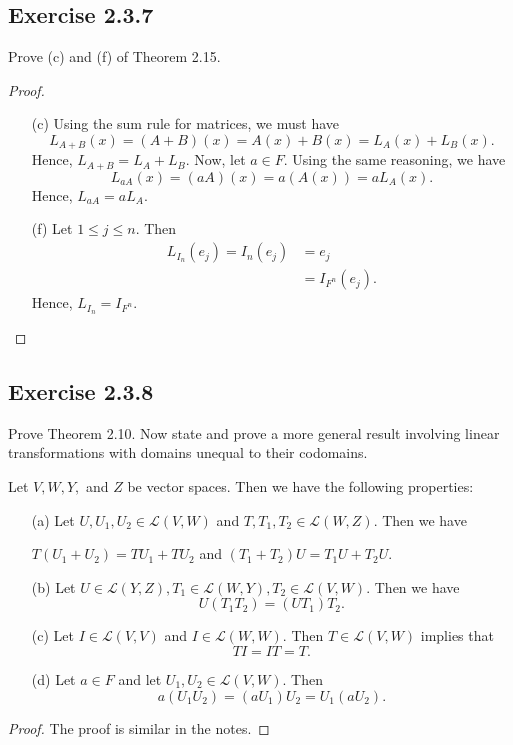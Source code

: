 \subsection*{Exercise 2.3.7} Prove (c) and (f) of Theorem 2.15.
\begin{proof}
\begin{enumerate}
    \item[(c)] Using the sum rule for matrices, we must have
            \[  {L}_{A+B}(x) = (A+B)(x) = A(x) + B(x) = {L}_{A}(x) + {L}_{B}(x). \]
            Hence, \( {L}_{A+B} = {L}_{A} + {L}_{B} \). Now, let \( a \in F  \). Using the same reasoning, we have  
            \[  {L}_{aA}(x) = (aA)(x) = a (A(x)) = a {L}_{A}(x).  \]
            Hence, \( {L}_{aA} = a{L}_{A}. \)
        \item[(f)] Let \( 1 \leq j \leq n  \). Then
                \begin{align*}  {L}_{{I}_{n}}({e}_{j}) = {I}_{n}({e}_{j}) 
                &= {e}_{j} \\ 
                &= {I}_{F^{n}}({e}_{j}) \tag{Part (d) of Theorem 2.3.4}.
                \end{align*}
            Hence, \( {L}_{{I}_{n}} = {I}_{F^{n}} \).

\end{enumerate}
\end{proof}

\subsection*{Exercise 2.3.8} Prove Theorem 2.10. Now state and prove a more general result involving linear transformations with domains unequal to their codomains.
\begin{prop}
    Let \( V , W, Y,  \) and \( Z  \) be vector spaces. Then we have the following properties:
    \begin{enumerate}
        \item[(a)] Let \( U, {U}_{1}, {U}_{2} \in \mathcal{L}(V,W)  \) and \( T, {T}_{1}, {T}_{2} \in \mathcal{L}(W,Z) \). Then we have
            \begin{center}
                \( T({U}_{1} + {U}_{2}) = {TU}_{1} + {TU}_{2}  \) and \( ({T}_{1} + {T}_{2}) U = {T}_{1} U + {T}_{2} U  \).
            \end{center}
        \item[(b)] Let \( U \in \mathcal{L}(Y,Z),  {T}_{1} \in \mathcal{L}(W,Y) , {T}_{2} \in \mathcal{L}(V,W)   \). Then we have
            \[  U({T}_{1} {T}_{2}) = (U {T}_{1}){T}_{2}. \]
        \item[(c)] Let \( I \in \mathcal{L}(V,V)  \) and \( I \in \mathcal{L}(W,W)  \). Then \( T \in \mathcal{L}(V,W)  \) implies that 
            \[  TI = IT = T. \]
        \item[(d)] Let \( a \in F  \) and let \( {U}_{1}, {U}_{2} \in \mathcal{L}(V,W) \). Then
            \[  a({U}_{1} {U}_{2}) = ({aU}_{1}) {U}_{2} = {U}_{1} ({aU}_{2}). \]
    \end{enumerate}
\end{prop}
\begin{proof}
The proof is similar in the notes.
\end{proof}

